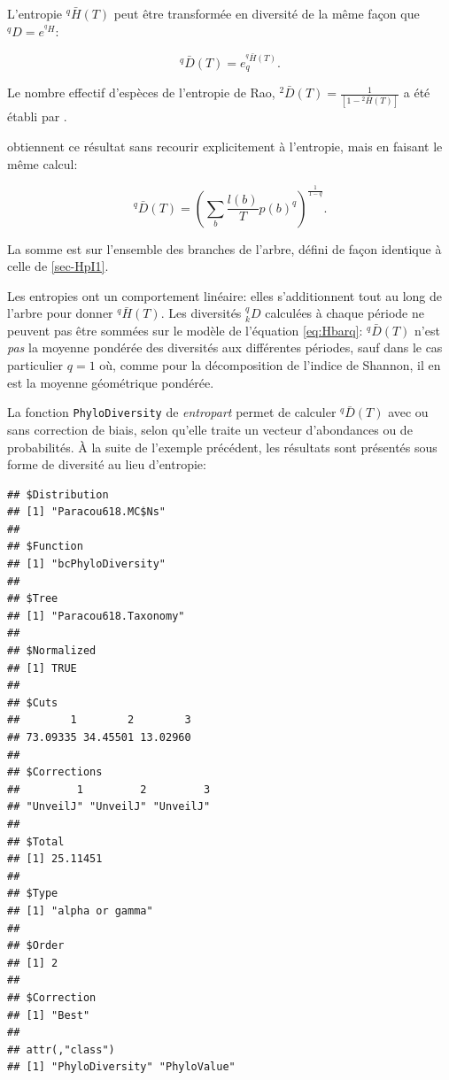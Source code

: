 \documentclass[
  11pt,
  french,
  a4paper,
  extrafontsizes,onecolumn,openright
  ]{memoir}
\newenvironment{Shaded}{\begin{snugshade}}{\end{snugshade}}
\newcommand{\DecValTok}[1]{\textcolor[rgb]{0.00,0.00,0.81}{#1}}
\newcommand{\FunctionTok}[1]{\textcolor[rgb]{0.13,0.29,0.53}{\textbf{#1}}}
\newcommand{\NormalTok}[1]{#1}
\newcommand{\SpecialCharTok}[1]{\textcolor[rgb]{0.81,0.36,0.00}{\textbf{#1}}}
\begin{document}
L'entropie \(^{q}\!\bar{H}(T)\) peut être transformée en diversité \autocite{Marcon2014a} de la même façon que \(^{q}\!D = e^{^{q}\!H}\):

\begin{equation}
  \label{eq:DbarqT}
  ^{q}\!\bar{D}\left(T\right)=e^{^{q}\!\bar{H}\left(T\right)}_q.
\end{equation}

Le nombre effectif d'espèces de l'entropie de Rao, \({^{2}\!\bar{D}}(T)=\frac{1}{[1-{^{2}\!\bar{H}}(T)]}\) a été établi par \textcite{Ricotta2009}.

\textcite{Chao2010} obtiennent ce résultat sans recourir explicitement à l'entropie, mais en faisant le même calcul:

\begin{equation}
  \label{eq:DbarqChao}
  {^{q}\!\bar{D}} \left( T \right)
  =\left( \sum_b{\frac{l(b)}{T} p(b)^q} \right)^{\frac{1}{1-q}}.
\end{equation}

La somme est sur l'ensemble des branches de l'arbre, défini de façon identique à celle de \textcite{Allen2009} \ref{sec-HpI1}.

Les entropies ont un comportement linéaire: elles s'additionnent tout au long de l'arbre pour donner \(^{q}\!\bar{H}(T)\).
Les diversités \(^{q}_{k}\!D\) calculées à chaque période ne peuvent pas être sommées sur le modèle de l'équation \eqref{eq:Hbarq}: \(^{q}\!\bar{D}(T)\) n'est \emph{pas} la moyenne pondérée des diversités aux différentes périodes, sauf dans le cas particulier \(q=1\) où, comme pour la décomposition de l'indice de Shannon, il en est la moyenne géométrique pondérée.

La fonction \texttt{PhyloDiversity} de \emph{entropart} permet de calculer \(^{q}\!\bar{D}(T)\) avec ou sans correction de biais, selon qu'elle traite un vecteur d'abondances ou de probabilités.
À la suite de l'exemple précédent, les résultats sont présentés sous forme de diversité au lieu d'entropie:

\scriptsize

\begin{Shaded}
\end{Shaded}

\begin{verbatim}
## $Distribution
## [1] "Paracou618.MC$Ns"
## 
## $Function
## [1] "bcPhyloDiversity"
## 
## $Tree
## [1] "Paracou618.Taxonomy"
## 
## $Normalized
## [1] TRUE
## 
## $Cuts
##        1        2        3 
## 73.09335 34.45501 13.02960 
## 
## $Corrections
##         1         2         3 
## "UnveilJ" "UnveilJ" "UnveilJ" 
## 
## $Total
## [1] 25.11451
## 
## $Type
## [1] "alpha or gamma"
## 
## $Order
## [1] 2
## 
## $Correction
## [1] "Best"
## 
## attr(,"class")
## [1] "PhyloDiversity" "PhyloValue"
\end{verbatim}
\end{document}
